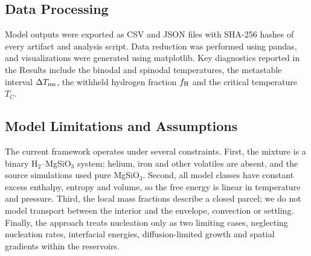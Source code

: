 \subsection{Data Processing}

Model outputs were exported as CSV and JSON files with SHA-256 hashes of every artifact and
analysis script. Data reduction was performed using pandas, and visualizations were generated
using matplotlib. Key diagnostics reported in the Results include the binodal and spinodal
temperatures, the metastable interval $\Delta T_{\rm ms}$, the withheld hydrogen fraction
$f_{\rm H}$ and the critical temperature $T_C$.

\subsection{Model Limitations and Assumptions}

The current framework operates under several constraints. First, the mixture is a binary
H$_2$--MgSiO$_3$ system; helium, iron and other volatiles are absent, and the source
simulations used pure MgSiO$_3$. Second, all model classes have constant excess enthalpy,
entropy and volume, so the free energy is linear in temperature and pressure. Third, the
local mass fractions describe a closed parcel; we do not model transport between the
interior and the envelope, convection or settling. Finally, the approach treats nucleation
only as two limiting cases, neglecting nucleation rates, interfacial energies,
diffusion-limited growth and spatial gradients within the reservoirs.
